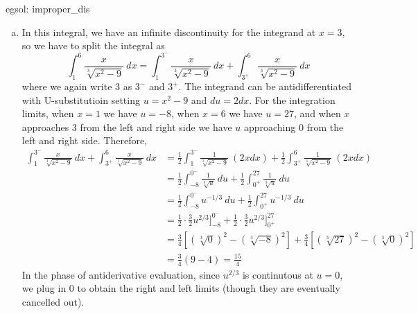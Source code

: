 \begin{egsol}[]{egsol: improper_dis}
\begin{enumerate}[a)]
\begin{align*}
            \int_1^{2^-} \frac{x}{x^2-4}~dx + \int_{2^+}^3 \frac{x}{x^2-4}~dx &= \frac{1}{2}\int_1^{2^-} \frac{1}{x^2-4}~(2xdx) + \frac{1}{2} \int_{2^+}^3 \frac{1}{x^2-4}~(2xdx)\\
            &= \frac{1}{2}\int_{-3}^{0^-} \frac{1}{u}du + \frac{1}{2}\int_{0^+}^5 \frac{1}{u}du\\
            &= \frac{1}{2} \ln|u|\big]_{-3}^{0^-} + \frac{1}{2} \ln|u|\big]_{0^+}^{5}\\
            &= \frac{1}{2}\Big[\lim_{u \rightarrow 0^-} \ln|u| - \ln 3\Big] + \frac{1}{2}\Big[\ln 5-\lim_{u \rightarrow 0^+} \ln|u|\Big]
        \end{align*}
        Now both limits in the last line evaluate to $-\infty$, so the expression becomes a $\infty - \infty$ indeterminate form.  Therefore, this improper integral simply \textbf{does not exist}.  Note that if we ignored the infinite discontinuity, we would get a wrong answer of $\frac{1}{2}\ln\frac{5}{3}$. 
        \item In this integral, we have an infinite discontinuity for the integrand at $x = 3$, so we have to split the integral as
        \[\int_1^6 \frac{x}{\sqrt[3]{x^2-9}}~dx = \int_1^{3^-} \frac{x}{\sqrt[3]{x^2-9}}~dx + \int_{3^+}^6 \frac{x}{\sqrt[3]{x^2-9}}~dx\]
        where we again write $3$ as $3^-$ and $3^+$.  The integrand can be antidifferentiated with U-substitutioin setting $u = x^2-9$ and $du = 2dx$.  For the integration limits, when $x = 1$ we have $u = -8$, when $x = 6$ we have $u = 27$, and when $x$ approaches $3$ from the left and right side we have $u$ approaching $0$ from the left and right side.  Therefore,
        \begin{align*}
            \int_1^{3^-} \frac{x}{\sqrt[3]{x^2-9}}~dx + \int_{3^+}^6 \frac{x}{\sqrt[3]{x^2-9}}~dx &= \frac{1}{2}\int_1^{3^-} \frac{1}{\sqrt[3]{x^2-9}}~(2xdx) + \frac{1}{2}\int_{3^+}^6 \frac{1}{\sqrt[3]{x^2-9}}~(2xdx)\\
            &= \frac{1}{2}\int_{-8}^{0^-} \frac{1}{\sqrt[3]{u}}~du + \frac{1}{2}\int_{0^+}^{27} \frac{1}{\sqrt[3]{u}}~du\\
            &= \frac{1}{2}\int_{-8}^{0^-} u^{-1/3}~du + \frac{1}{2}\int_{0^+}^{27} u^{-1/3}~du\\
            &= \frac{1}{2}\cdot\frac{3}{2} u^{2/3}\big]_{-8}^{0^-} + \frac{1}{2}\cdot\frac{3}{2} u^{2/3}\big]_{0^+}^{27}\\
            &= \frac{3}{4}[(\sqrt[3]{0})^2-(\sqrt[3]{-8})^2] + \frac{3}{4}[(\sqrt[3]{27})^2-(\sqrt[3]{0})^2]\\
            &= \frac{3}{4}(9-4) = \frac{15}{4}
        \end{align*}
        In the phase of antiderivative evaluation, since $u^{2/3}$ is continutous at $u=0$, we plug in $0$ to obtain the right and left limits (though they are eventually cancelled out). 
    \end{enumerate}
\end{egsol}

